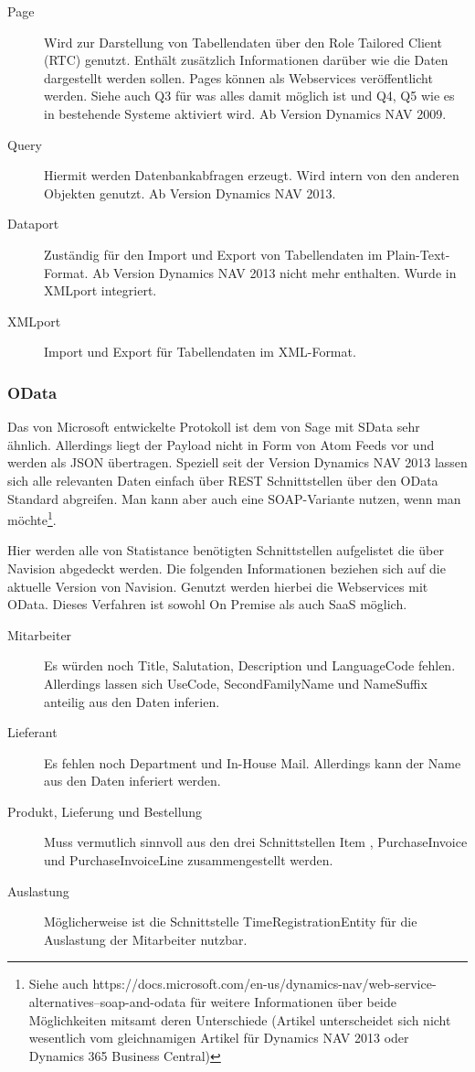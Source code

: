 \begin{description}
\item [Page] Wird zur Darstellung von Tabellendaten über den Role Tailored Client (RTC) genutzt. Enthält zusätzlich Informationen darüber wie die Daten dargestellt werden sollen. Pages können als Webservices veröffentlicht werden. Siehe auch Q3 für was alles damit möglich ist und Q4, Q5 wie es in bestehende Systeme aktiviert wird. Ab Version Dynamics NAV 2009.
\item [Query] Hiermit werden Datenbankabfragen erzeugt. Wird intern von den anderen Objekten genutzt. Ab Version Dynamics NAV 2013.
\item [Dataport] Zuständig für den Import und Export von Tabellendaten im Plain-Text-Format. Ab Version Dynamics NAV 2013 nicht mehr enthalten. Wurde in XMLport integriert.
\item [XMLport] Import und Export für Tabellendaten im XML-Format.
\end{description}

\subsubsection*{OData}
Das von Microsoft entwickelte Protokoll ist dem von Sage mit SData sehr ähnlich. Allerdings liegt der Payload nicht in Form von Atom Feeds vor und werden als JSON übertragen.
Speziell seit der Version Dynamics NAV 2013 lassen sich alle relevanten Daten einfach über REST Schnittstellen über den OData Standard abgreifen. Man kann aber auch eine SOAP-Variante nutzen, wenn man möchte\footnote{Siehe auch https://docs.microsoft.com/en-us/dynamics-nav/web-service-alternatives--soap-and-odata für weitere Informationen über beide Möglichkeiten mitsamt deren Unterschiede (Artikel unterscheidet sich nicht wesentlich vom gleichnamigen Artikel für Dynamics NAV 2013 oder Dynamics 365 Business Central)}.

Hier werden alle von Statistance benötigten Schnittstellen aufgelistet die über Navision abgedeckt werden. Die folgenden Informationen beziehen sich auf die aktuelle Version von Navision. Genutzt werden hierbei die Webservices mit OData. Dieses Verfahren ist sowohl On Premise als auch SaaS möglich.

\begin{description}
    \item[Mitarbeiter \cite{nav_employee}]
    Es würden noch Title, Salutation, Description und LanguageCode fehlen. Allerdings lassen sich UseCode, SecondFamilyName und NameSuffix anteilig aus den Daten inferien.
    \item[Lieferant \cite{nav_vendor}]
    Es fehlen noch Department und In-House Mail. Allerdings kann der Name aus den Daten inferiert werden.
    \item[Produkt, Lieferung und Bestellung]
    Muss vermutlich sinnvoll aus den drei Schnittstellen Item \cite{nav_item}, PurchaseInvoice \cite{nav_invoice} und PurchaseInvoiceLine \cite{nav_invoiceline} zusammengestellt werden.
    \item[Auslastung]
    Möglicherweise ist die Schnittstelle TimeRegistrationEntity \cite{nav_timeregistrationentry} für die Auslastung der Mitarbeiter nutzbar.
\end{description}

